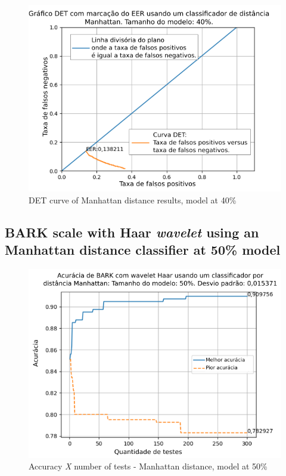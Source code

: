 \begin{figure}[!h]
	\centering
	\includegraphics[width=.9\linewidth]{images/results/det/DET_for_classifier_Manhattan_40}
	\caption{DET curve of Manhattan distance results, model at 40\%}
	\label{fig:detforclassifiermanhattan40}
\end{figure}

\subsection{BARK scale with Haar \textit{wavelet} using an Manhattan distance classifier at 50\% model}



\begin{figure}[ht]
	\centering
	\includegraphics[width=\linewidth]{images/results/confusionMatrices/classifier_Manhattan_50.png}
	\caption{Accuracy \textit{X} number of tests - Manhattan distance, model at 50\%}
	\label{fig:classifiermanhattan50}
\end{figure}

